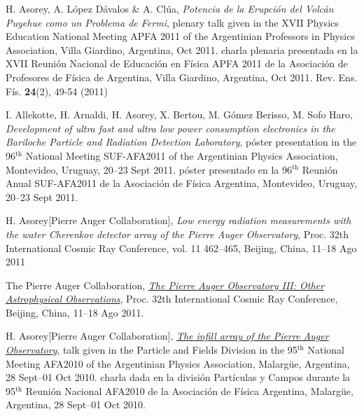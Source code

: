 \begin{etaremune}
\item {}H. Asorey, A. López Dávalos \& A. Clúa, {\emph{Potencia de la Erupción del Volcán Puyehue como un Problema de Fermi}},
\ifeng
plenary talk given in the XVII Physics Education National Meeting APFA 2011 of the Argentinian Professors in Physics Association, Villa Giardino, Argentina, Oct 2011.
\else
charla plenaria presentada en la XVII Reunión Nacional de Educación en Física APFA 2011 de la Asociación de Profesores de Física de Argentina, Villa Giardino, Argentina, Oct 2011.
\fi
Rev. Ens. Fís. {\bf{24}}(2), 49-54 (2011)

\item {}I. Allekotte, H. Arnaldi, H. Asorey, X. Bertou, M. Gómez Berisso,
M. Sofo Haro, {\emph{Development of ultra fast and ultra low power consumption
electronics in the Bariloche Particle and Radiation Detection Laboratory}},
\ifeng
póster presentation in the 96$^{\mathrm{th}}$ National Meeting SUF-AFA2011 of the Argentinian Physics Association, Montevideo, Uruguay, 20--23 Sept 2011.
\else
póster presentado en la 96$^{\mathrm{th}}$ Reunión Anual SUF-AFA2011 de la Asociación de Física Argentina, Montevideo, Uruguay, 20--23 Sept 2011.
\fi

\item {}H. Asorey[Pierre Auger Collaboration], {\emph{Low energy radiation
measurements with the water Cherenkov detector array of the Pierre Auger
Observatory}}, \en Proc. 32th International Cosmic Ray Conference, vol. 11
462--465, Beijing, China, 11--18 Ago 2011

\item {}The Pierre Auger Collaboration,
\href{http://arxiv.org/abs/1107.4805}{\emph{The Pierre Auger Observatory III:
Other Astrophysical Observations}}, \en Proc. 32th International Cosmic Ray
Conference, Beijing, China, 11--18 Ago 2011.

\item {}H. Asorey[Pierre Auger Collaboration],
\href{http://95rnf.afa.webfactional.com/tex\_files/Resumenes/DPyC/PyC\_6.pdf}{\emph{The
infill array of the Pierre Auger Observatory}}, 
\ifeng
talk given in the Particle and Fields Division in the 95$^{\mathrm{th}}$ National Meeting AFA2010 of the Argentinian Physics Association, Malargüe, Argentina, 28 Sept--01 Oct 2010.
\else
charla dada en la división Partículas y Campos durante la 95$^{\mathrm{th}}$ Reunión Nacional AFA2010 de la Asociación de Física Argentina, Malargüe, Argentina, 28 Sept--01 Oct 2010.
\fi


\end{etaremune}

